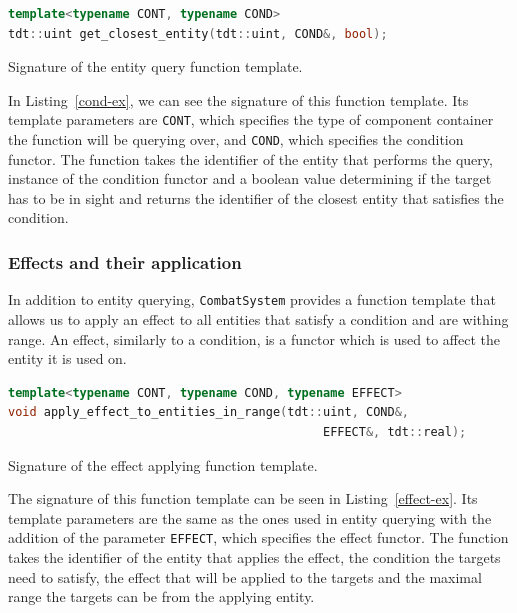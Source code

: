\begin{listing}
    \centering
    \begin{lstlisting}[language=C++]
template<typename CONT, typename COND>
tdt::uint get_closest_entity(tdt::uint, COND&, bool);
    \end{lstlisting}
    \caption{Signature of the entity query function template.}
    \label{cond-ex}
\end{listing}

In Listing~\ref{cond-ex}, we can see the signature of this function template. Its template parameters are \texttt{CONT}, which specifies
the type of component container the function will be querying over, and \texttt{COND}, which specifies the condition functor. The function
takes the identifier of the entity that performs the query, instance of the condition functor and a boolean value determining if the
target has to be in sight and returns the identifier of the closest entity that satisfies the condition.

\subsubsection{Effects and their application}

In addition to entity querying, \texttt{CombatSystem} provides a function template that allows us to apply an effect to all entities
that satisfy a condition and are withing range. An effect, similarly to a condition, is a functor which is used to affect the entity
it is used on.

\begin{listing}
    \centering
    \begin{lstlisting}[language=C++]
template<typename CONT, typename COND, typename EFFECT>
void apply_effect_to_entities_in_range(tdt::uint, COND&,
                                            EFFECT&, tdt::real);
    \end{lstlisting}
    \caption{Signature of the effect applying function template.}
    \label{effect-ex}
\end{listing}

The signature of this function template can be seen in Listing~\ref{effect-ex}. Its template parameters are the same as the ones used
in entity querying with the addition of the parameter \texttt{EFFECT}, which specifies the effect functor. The function takes the
identifier of the entity that applies the effect, the condition the targets need to satisfy, the effect that will be applied to the
targets and the maximal range the targets can be from the applying entity.

